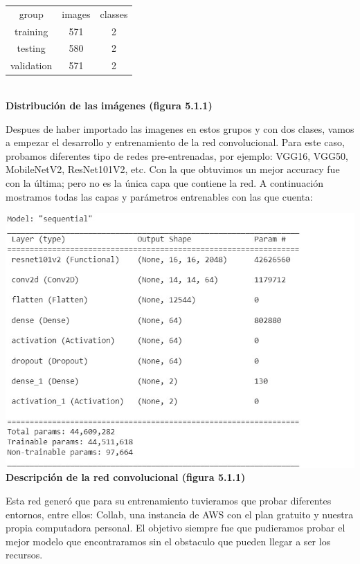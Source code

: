 \documentclass{article}
\begin{document}
        \begin{center}
            \begin{tabular}{|c|c|c|}
            \hline
            group & images & classes  \\
            training & 571 & 2  \\
            testing & 580 & 2  \\
            validation & 571 & 2  \\
            \hline
            \end{tabular}\\
            \textbf{Distribución de las imágenes (figura 5.1.1)}
        \end{center}

        Despues de haber importado las imagenes en estos grupos y con dos clases, vamos a empezar el desarrollo y entrenamiento de la red convolucional.
        Para este caso, probamos diferentes tipo de redes pre-entrenadas, por ejemplo: VGG16, VGG50, MobileNetV2, ResNet101V2, etc. Con la que obtuvimos un mejor accuracy fue con la última; pero no es la única capa que contiene la red. A continuación mostramos todas las capas y parámetros entrenables con las que cuenta:

        \begin{center}
                \includegraphics[scale=0.7]{images/model_sequential.PNG.jpg} \\
                \textbf{Descripción de la red convolucional (figura 5.1.1)} 
        \end{center}

        Esta red generó que para su entrenamiento tuvieramos que probar diferentes entornos, entre ellos: Collab, una instancia de AWS con el plan gratuito y nuestra propia computadora personal. El objetivo siempre fue que pudieramos probar el mejor modelo que encontraramos sin el obstaculo que pueden llegar a ser los recursos.
\end{document}
